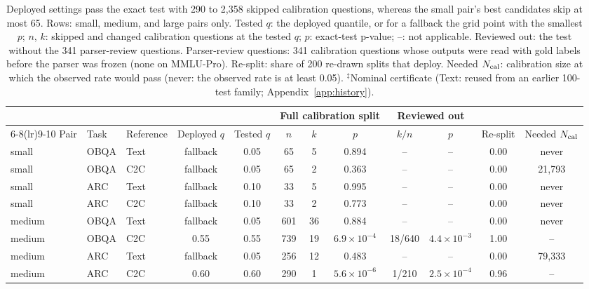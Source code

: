 \begin{table}[!htbp]\centering\scriptsize
\caption{Deployed settings pass the exact test with 290 to 2,358 skipped calibration questions, whereas the small pair's best candidates skip at most 65. Rows: small, medium, and large pairs only. Tested $q$: the deployed quantile, or for a fallback the grid point with the smallest $p$; $n$, $k$: skipped and changed calibration questions at the tested $q$; $p$: exact-test p-value; --: not applicable. Reviewed out: the test without the 341 parser-review questions. Parser-review questions: 341 calibration questions whose outputs were read with gold labels before the parser was frozen (none on MMLU-Pro). Re-split: share of 200 re-drawn splits that deploy. Needed $N_{\rm cal}$: calibration size at which the observed rate would pass (never: the observed rate is at least 0.05). $^\ddagger$Nominal certificate (Text: reused from an earlier 100-test family; Appendix~\ref{app:history}).}
\label{tab:calstats}
\renewcommand{\arraystretch}{1.1}\setlength{\tabcolsep}{2.5pt}
\begin{tabular*}{\linewidth}{@{}lll@{\hspace{5pt}\extracolsep{\fill}}ccccccccc@{}}\toprule
& & & & & \multicolumn{3}{c}{Full calibration split} & \multicolumn{2}{c}{Reviewed out} & & \\\cmidrule(lr){6-8}\cmidrule(lr){9-10}
Pair & Task & Reference & Deployed $q$ & Tested $q$ & $n$ & $k$ & $p$ & $k/n$ & $p$ & Re-split & Needed $N_{\rm cal}$\\\midrule
small & OBQA & Text & fallback & 0.05 & 65 & 5 & 0.894 & -- & -- & 0.00 & never\\
small & OBQA & C2C & fallback & 0.05 & 65 & 2 & 0.363 & -- & -- & 0.00 & 21,793\\
small & ARC & Text & fallback & 0.10 & 33 & 5 & 0.995 & -- & -- & 0.00 & never\\
small & ARC & C2C & fallback & 0.10 & 33 & 2 & 0.773 & -- & -- & 0.00 & never\\
\addlinespace[2pt]
medium & OBQA & Text & fallback & 0.05 & 601 & 36 & 0.884 & -- & -- & 0.00 & never\\
medium & OBQA & C2C & 0.55 & 0.55 & 739 & 19 & $6.9\times10^{-4}$ & 18/640 & $4.4\times10^{-3}$ & 1.00 & --\\
medium & ARC & Text & fallback & 0.05 & 256 & 12 & 0.483 & -- & -- & 0.00 & 79,333\\
medium & ARC & C2C & 0.60 & 0.60 & 290 & 1 & $5.6\times10^{-6}$ & 1/210 & $2.5\times10^{-4}$ & 0.96 & --\\

\end{tabular*}
\end{table}
